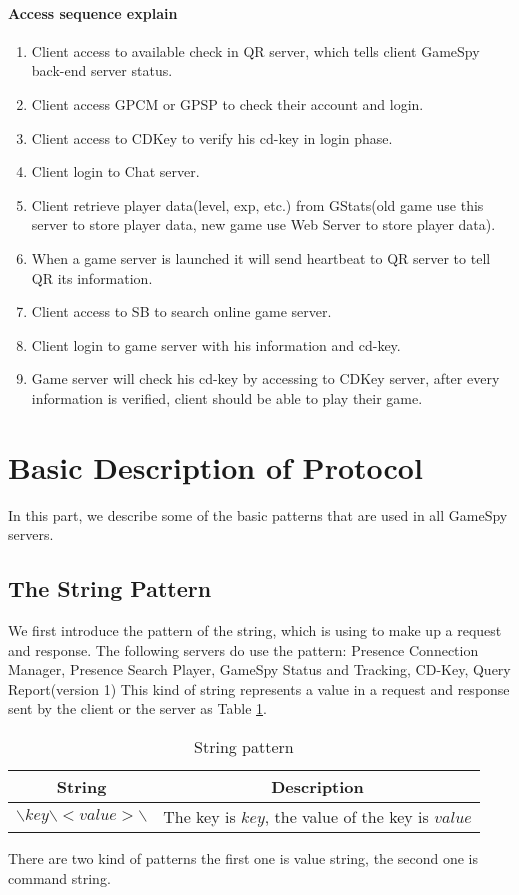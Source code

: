 \documentclass[oneside,titlepage,a4paper]{Definition/retrospy} %
\begin{document}
\paragraph{Access sequence explain}
\begin{enumerate}
	\item Client access to available check in QR server, which tells client GameSpy back-end server status.
	\item Client access GPCM or GPSP to check their account and login.
	\item Client access to CDKey to verify his cd-key in login phase.
	\item Client login to Chat server.
	\item Client retrieve player data(level, exp, etc.) from GStats(old game use this server to store player data, new game use Web Server to store player data).
	\item When a game server is launched it will send heartbeat to QR server to tell QR its information.
	\item Client access to SB to search online game server.
	\item Client login to game server with his information and cd-key.
	\item Game server will check his cd-key by accessing to CDKey server, after every information is verified, client should be able to play their game.
\end{enumerate}


\section{Basic Description of Protocol}
In this part, we describe some of the basic patterns that are used in all GameSpy servers.

\subsection{The String Pattern}
We first introduce the pattern of the string, which is using to make up a request and response.
The following servers do use the pattern: Presence Connection Manager, Presence Search Player, GameSpy Status and Tracking, CD-Key, Query Report(version 1)
This kind of string represents a value in a request and response sent by the client or the server as Table \ref{String pattern}.\\


\begin{table}[H]
	\centering
	\begin{tabular}{|c|c|}
		\hline 
		\textbf{String}&\textbf{Description}  \\ 
		\hline 
		$ \backslash key \backslash < value > \backslash $& The key is $ key $, the value of the key is $  value  $  \\ 
 		\hline
	\end{tabular} 
	\caption{String pattern}
	\label{String pattern}
\end{table}
There are two kind of patterns the first one is value string, the second one is command string.
\end{document}
